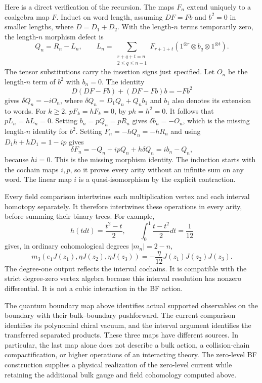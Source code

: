 Here is a direct verification of the recursion.  The maps $F_n$
extend uniquely to a coalgebra map $F$.  Induct on word length,
assuming $DF=Fb$ and $b^2=0$ in smaller lengths, where $D=D_1+D_2$.
With the length-$n$ terms temporarily zero, the length-$n$ morphism
defect is
\[
 Q_n=R_n-L_n,\qquad
 L_n=\sum_{\substack{r+q+t=n\\2\le q\le n-1}}
 F_{r+1+t}(1^{\otimes r}\otimes b_q\otimes1^{\otimes t}).
\]
The tensor substitutions carry the insertion signs just specified.
Let $O_n$ be the length-$n$ term of $b^2$ with $b_n=0$.
The identity
\[
 D(DF-Fb)+(DF-Fb)b=-Fb^2
\]
gives $\delta Q_n=-iO_n$, where
$\delta Q_n=D_1Q_n+Q_nb_1$ and $b_1$ also denotes its extension to
words.  For $k\ge2$, $pF_k=hF_k=0$, by $ph=h^2=0$.
It follows that $pL_n=hL_n=0$.
Setting $b_n=pQ_n=pR_n$ gives $\delta b_n=-O_n$, which is the
missing length-$n$ identity for $b^2$.
Setting $F_n=-hQ_n=-hR_n$ and using $D_1h+hD_1=1-ip$ gives
\[
 \delta F_n=-Q_n+ipQ_n+h\delta Q_n=ib_n-Q_n,
\]
because $hi=0$.  This is the missing morphism identity.
The induction starts with the cochain maps $i,p$, so it proves every
arity without an infinite sum on any word.  The linear map $i$ is a
quasi-isomorphism by the explicit contraction.

Every field comparison intertwines each multiplication vertex and
each interval homotopy separately.  It therefore intertwines these
operations in every arity, before summing their binary trees.
For example,
\[
 h(tdt)=\frac{t^2-t}{2},\qquad
 \int_0^1\frac{t-t^2}{2}dt=\frac1{12}
\]
gives, in ordinary cohomological degrees $|m_n|=2-n$,
\[
 m_3(e_1J(z_1),\eta J(z_2),\eta J(z_3))
       =-\frac\eta{12}J(z_1)J(z_2)J(z_3).
\]
The degree-one output reflects the interval cochains.  It is compatible
with the strict degree-zero vertex algebra because this interval
resolution has nonzero differential.  It is not a cubic interaction
in the BF action.

The quantum boundary map above identifies actual supported
observables on the boundary with their bulk--boundary pushforward.
The current comparison identifies its polynomial chiral vacuum, and
the interval argument identifies the transferred separated products.
These three maps have different sources.  In particular, the last
map alone does not describe a bulk action, a collision-chain
compactification, or higher operations of an interacting theory.
The zero-level BF construction supplies a physical realization of
the zero-level current while retaining the additional bulk gauge and
field cohomology computed above.
